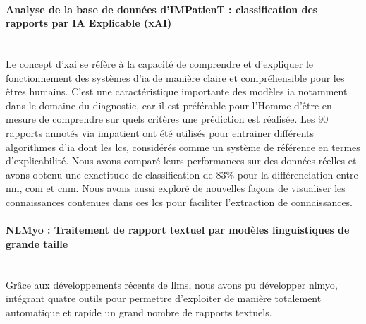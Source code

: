 \paragraph{\textbf{Analyse de la base de données d’IMPatienT : classification des rapports par IA Explicable (xAI)}}\mbox{}\\

Le concept d’\gls{xai} se réfère à la capacité de comprendre et d’expliquer le fonctionnement des systèmes d’\gls{ia} de manière claire et compréhensible pour les êtres humains. C’est une caractéristique importante des modèles \gls{ia} notamment dans le domaine du diagnostic, car il est préférable pour l’Homme d’être en mesure de comprendre sur quels critères une prédiction est réalisée. Les 90 rapports annotés via \gls{impatient} ont été utilisés pour entrainer différents algorithmes d'\gls{ia} dont les \gls{lcs}, considérés comme un système de référence en termes d’explicabilité. Nous avons comparé leurs performances sur des données réelles et avons obtenu une exactitude de classification de 83\% pour la différenciation entre \gls{nm}, \gls{com} et \gls{cnm}. Nous avons aussi exploré de nouvelles façons de visualiser les connaissances contenues dans ces \gls{lcs} pour faciliter l’extraction de connaissances.

\paragraph{\textbf{NLMyo : Traitement de rapport textuel par modèles linguistiques de grande taille}}\mbox{}\\

Grâce aux développements récents de \gls{llms}, nous avons pu développer \gls{nlmyo}, intégrant quatre outils pour permettre d’exploiter de manière totalement automatique et rapide un grand nombre de rapports textuels.

